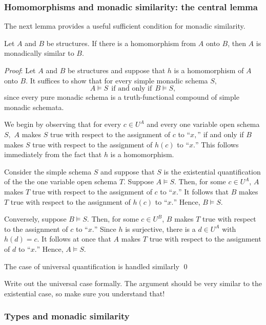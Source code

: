 \subsubsection*{Homomorphisms and monadic similarity: the central lemma}

The next lemma provides a useful sufficient condition for monadic similarity.
\begin{lemma}\label{hom-lem}
Let $A$ and $B$ be structures. If there is a homomorphism from $A$
onto $B$, then $A$ is monadically similar to $B$. 
\end{lemma}
\emph{Proof}:
Let $A$ and $B$ be structures and suppose that $h$ is a homomorphism of $A$
onto $B.$ It suffices to show that for every simple monadic schema $S,$
\[A\models S\ \ \mbox{if and only if}\ \ B\models S,\]
since every pure monadic schema is a truth-functional compound of simple
monadic schemata.

We begin by observing that for every $c \in U^A$ and every one variable open
schema $S,$ $A$ makes $S$ true with respect to the assignment of $c$ to
``$x,$''
 if and only if $B$ makes $S$ true with respect to the assignment of
$h(c)$ to ``$x.$'' This follows immediately from the fact that $h$ is a
homomorphism.

Consider the simple schema $S$ and suppose that $S$ is the existential
quantification of the the one variable open schema $T$.
Suppose $A \models S.$ Then, for some $c \in U^A$,
$A$ makes $T$ true with respect to the assignment of $c$ to
``$x.$'' It follows that $B$ makes $T$ true with respect to the assignment of $h(c)$
to ``$x.$'' Hence, $B \models S.$

Conversely, suppose $B \models S.$
Then, for some $c \in U^B$,
$B$ makes $T$ true with respect to the assignment of $c$ to
``$x.$'' Since $h$ is surjective, there is a $d \in U^A$ with $h(d) = c.$
It follows at once that $A$ makes $T$ true with respect to the assignment of
$d$ to ``$x.$'' Hence, $A \models S.$ 

The case of universal quantification is handled similarly
\qed

\begin{aside}
    Write out the universal case formally. The argument should be very similar to the existential case, so make sure you understand that!
\end{aside}

\subsubsection*{Types and monadic similarity}


